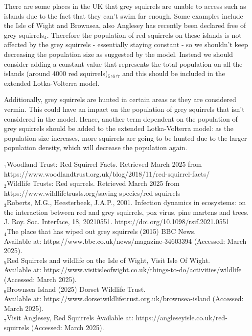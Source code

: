\documentclass[11pt]{article}
\begin{document}
     There are some places in the UK that grey squirrels are unable to access such as islands due to the fact that they can't swim far enough. Some examples include the Isle of Wight and Brownsea, also Anglesey has recently been declared free of grey squirrels$_{4}$. Therefore the population of red squirrels on these islands is not affected by the grey squirrels - essentially staying constant - so we shouldn't keep decreasing the population size as suggested by the model. Instead we should consider adding a constant value that represents the total population on all the islands (around 4000 red squirrels)$_{5}$,$_{6}$,$_{7}$ and this should be included in the extended Lotka-Volterra model.

     Additionally, grey squirrels are hunted in certain areas as they are considered vermin. This could have an impact on the population of grey squirrels that isn't considered in the model. Hence, another term dependent on the population of grey squirrels should be added to the extended Lotka-Volterra model: as the population size increases, more squirrels are going to be hunted due to the larger population density, which will decrease the population again.

     \scriptsize{$_{1}$Woodland Trust: Red Squirrel Facts. Retrieved March 2025 from \\ https://www.woodlandtrust.org.uk/blog/2018/11/red-squirrel-facts/ \\ $_{2}$Wildlife Trusts: Red squrrels. Retrieved March 2025 from https://www.wildlifetrusts.org/saving-species/red-squirrels \\ $_{3}$Roberts, M.G., Heesterbeek, J.A.P., 2001. Infection dynamics in ecosystems: on the interaction between red and grey squirrels, pox virus, pine martens and trees. J. Roy. Soc. Interface, 18, 20210551. https://doi.org/10.1098/rsif.2021.0551 \\ $_{4}$The place that has wiped out grey squirrels (2015) BBC News. \\ Available at: https://www.bbc.co.uk/news/magazine-34603394 (Accessed: March 2025). \\ $_{5}$Red Squirrels and wildlife on the Isle of Wight, Visit Isle Of Wight. \\ Available at: https://www.visitisleofwight.co.uk/things-to-do/activities/wildlife \\ (Accessed: March 2025). \\ $_{6}$Brownsea Island (2025) Dorset Wildlife Trust. \\ Available at: https://www.dorsetwildlifetrust.org.uk/brownsea-island (Accessed: March 2025). \\  $_{7}$Visit Anglesey, Red Squirrels Available at: https://angleseyisle.co.uk/red-squirrels (Accessed: March 2025).}



     \textbf{}

     
\end{document}

